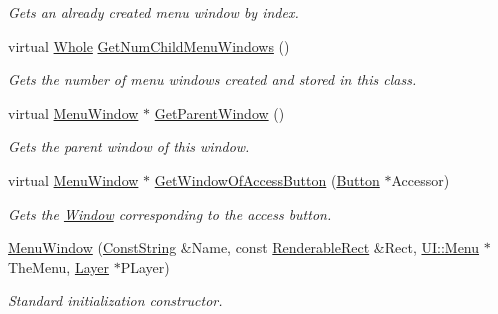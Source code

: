 \begin{DoxyCompactItemize}
\begin{DoxyCompactList}\small\item\em Gets an already created menu window by index. \item\end{DoxyCompactList}\item 
virtual \hyperlink{namespaceMezzanine_adcbb6ce6d1eb4379d109e51171e2e493}{Whole} \hyperlink{classMezzanine_1_1UI_1_1MenuWindow_aa6a04b93c0b65cb14941df11dade1a56}{GetNumChildMenuWindows} ()
\begin{DoxyCompactList}\small\item\em Gets the number of menu windows created and stored in this class. \item\end{DoxyCompactList}\item 
virtual \hyperlink{classMezzanine_1_1UI_1_1MenuWindow}{MenuWindow} $\ast$ \hyperlink{classMezzanine_1_1UI_1_1MenuWindow_ae112dc5c4a16e9d44f8dcb89e4ec73ec}{GetParentWindow} ()
\begin{DoxyCompactList}\small\item\em Gets the parent window of this window. \item\end{DoxyCompactList}\item 
virtual \hyperlink{classMezzanine_1_1UI_1_1MenuWindow}{MenuWindow} $\ast$ \hyperlink{classMezzanine_1_1UI_1_1MenuWindow_a6c00a489b0752a9d0b2f61f383529aee}{GetWindowOfAccessButton} (\hyperlink{classMezzanine_1_1UI_1_1Button}{Button} $\ast$Accessor)
\begin{DoxyCompactList}\small\item\em Gets the \hyperlink{classMezzanine_1_1UI_1_1Window}{Window} corresponding to the access button. \item\end{DoxyCompactList}\item 
\hyperlink{classMezzanine_1_1UI_1_1MenuWindow_af5bf6ab9217583a5622ef32426184316}{MenuWindow} (\hyperlink{namespaceMezzanine_a63cd699ac54b73953f35ec9cfc05e506}{ConstString} \&Name, const \hyperlink{structMezzanine_1_1UI_1_1RenderableRect}{RenderableRect} \&Rect, \hyperlink{classMezzanine_1_1UI_1_1Menu}{UI::Menu} $\ast$TheMenu, \hyperlink{classMezzanine_1_1UI_1_1Layer}{Layer} $\ast$PLayer)
\begin{DoxyCompactList}\small\item\em Standard initialization constructor. \item\end{DoxyCompactList}\item 

\end{DoxyCompactItemize}
